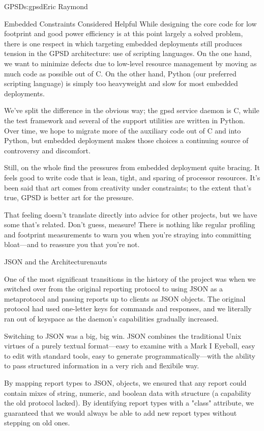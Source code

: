 \begin{aosachapter}{GPSD}{s:gpsd}{Eric Raymond}
\begin{aosasect1}{Embedded Constraints Considered Helpful}
While designing the core code for low footprint and good power
efficiency is at this point largely a solved problem, there is one
respect in which targeting embedded deployments still produces tension
in the GPSD architecture: use of scripting languages. On the one hand,
we want to minimize defects due to low-level resource management by
moving as much code as possible out of C.  On the other hand, Python
(our preferred scripting language) is simply too heavyweight and slow
for most embedded deployments.

We've split the difference in the obvious way; the gpsd service daemon
is C, while the test framework and several of the support utilities
are written in Python. Over time, we hope to migrate more of the
auxiliary code out of C and into Python, but embedded deployment makes
those choices a continuing source of controversy and discomfort.

Still, on the whole find the pressures from embedded deployment quite
bracing.  It feels good to write code that is lean, tight, and sparing
of processor resources.  It's been said that art comes from creativity
under constraints; to the extent that's true, GPSD is better art for
the pressure.

That feeling doesn't translate directly into advice for other projects,
but we have some that's related. Don't guess, measure! There is nothing
like regular profiling and footprint measurements to warn you when you're
straying into committing bloat---and to reassure you that you're not.

\end{aosasect1}

\begin{aosasect1}{JSON and the Architecturenauts}

One of the most significant transitions in the history of the project
was when we switched over from the original reporting protocol to
using JSON as a metaprotocol and passing reports up to clients as JSON
objects. The original protocol had used one-letter keys for commands
and responses, and we literally ran out of keyspace as the daemon's
capabilities gradually increased.

Switching to JSON was a big, big win. JSON combines the traditional
Unix virtues of a purely textual format---easy to examine with a Mark
I Eyeball, easy to edit with standard tools, easy to generate
programmatically---with the ability to pass structured information
in a very rich and flexibile way.  

By mapping report types to JSON, objects, we ensured that any report
could contain mixes of string, numeric, and boolean data with
structure (a capability the old protocol lacked).  By identifying
report types with a "class" attribute, we guaranteed that we would
always be able to add new report types without stepping on old ones.


\end{aosasect1}
\end{aosachapter}
